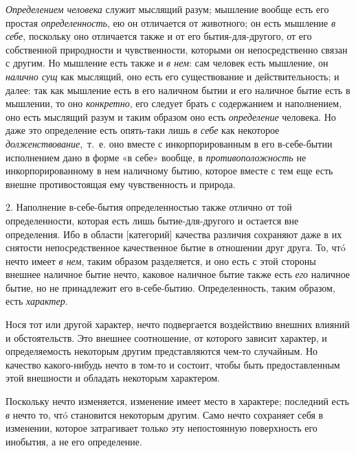 {\em Определением человека} служит мыслящий разум;
мышление вообще есть его простая {\em определенность},
ею он отличается от животного; он есть мышление {\em в
себе}, поскольку оно отличается также и от его бытия-для-другого, от его
собственной природности и чувственности, которыми он непосредственно связан
с другим. Но мышление есть также и {\em в нем}: сам
человек есть мышление, он {\em налично сущ} как
мыслящий, оно есть его существование и действительность; и далее: так как
мышление есть в его наличном бытии и его наличное бытие есть в мышлении, то
оно {\em конкретно}, его следует брать с содержанием и
наполнением, оно есть мыслящий разум и таким образом оно есть
{\em определение} человека. Но даже это определение
есть опять-таки лишь {\em в себе} как некоторое
{\em долженствование},~т.~е. оно вместе с
инкорпорированным в его в-себе-бытии исполнением дано в форме «в себе»
вообще, в {\em противоположность} не инкорпорированному
в нем наличному бытию, которое вместе с тем еще есть внешне противостоящая
ему чувственность и природа.

2. Наполнение в-себе-бытия определенностью также отлично от той
определенности, которая есть лишь бытие-для-другого и остается вне
определения. Ибо в области [категорий] качества различия сохраняют даже в
их снятости непосредственное качественное бытие в отношении друг друга. То,
чтó нечто имеет {\em в нем}, таким образом разделяется,
и оно есть с этой стороны внешнее наличное бытие нечто, каковое наличное
бытие также есть {\em его} наличное бытие, но не
принадлежит его в-себе-бытию. Определенность, таким образом, есть
{\em характер}.

Нося тот или другой характер, нечто подвергается воздействию внешних влияний
и обстоятельств. Это внешнее соотношение, от которого зависит характер, и
определяемость некоторым другим представляются чем-то случайным. Но
качество какого-нибудь нечто в том-то и состоит, чтобы быть предоставленным
этой внешности и обладать некоторым характером.

Поскольку нечто изменяется, изменение имеет место в характере; последний
есть {\em в} нечто то, чтó становится некоторым другим.
Само нечто сохраняет себя в изменении, которое затрагивает только эту
непостоянную поверхность его инобытия, а не его определение.

